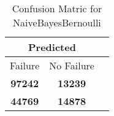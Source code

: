 \begin{table}[] 
\caption{Confusion Matric for NaiveBayesBernoulli} 
\label{Table: Prediction Accuracy-NoneNaiveBayesBernoulliOnlySunEKF-ignoreReflection-Reflection} 
\centering 
\begin{tabular} 
 {@{}ccc@{}} 
\toprule 
\multicolumn{2}{c}{\textbf{Predicted}}
 \\ \midrule 
\multicolumn{1}{|c|}{Failure} & 
\multicolumn{1}{c|}{No Failure}
 \\ \midrule 
\multicolumn{1}{|c|}{\color{green}\textbf{97242}} & 
\multicolumn{1}{c|}{\color{red}\textbf{13239}}
 \\ \midrule 
\multicolumn{1}{|c|}{\color{red}\textbf{44769}} & 
\multicolumn{1}{c|}{\color{green}\textbf{14878}}
 \\ \bottomrule 
\end{tabular} 
\end{table} 
